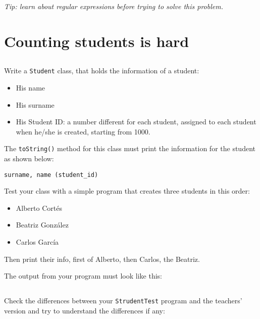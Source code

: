 \documentclass[a4paper, 11pt]{article}
\begin{document}
\textsl{Tip: learn about \emph{regular expressions} before trying to
solve this problem.}









\section{Counting students is hard}

\subsection{}

Write a \verb+Student+ class, that holds the information of a student:

\begin{itemize}

  \item His name

  \item His surname

  \item His Student ID: a number different for each student, assigned to each
    student when he/she is created, starting from 1000.

\end{itemize}

The \verb+toString()+ method for this class must print the information for the
student as shown below:

\verb+surname, name (student_id)+

Test your class with a simple program that creates three students in this order:

\begin{itemize}

  \item Alberto Cortés

  \item Beatriz González

  \item Carlos García

\end{itemize}

Then print their info, first of Alberto, then Carlos, the Beatriz.

The output from your program must look like this:



\subsection{}

Check the differences between your \verb+StrudentTest+ program and the
teachers' version and try to understand the differences if any:

\end{document}
